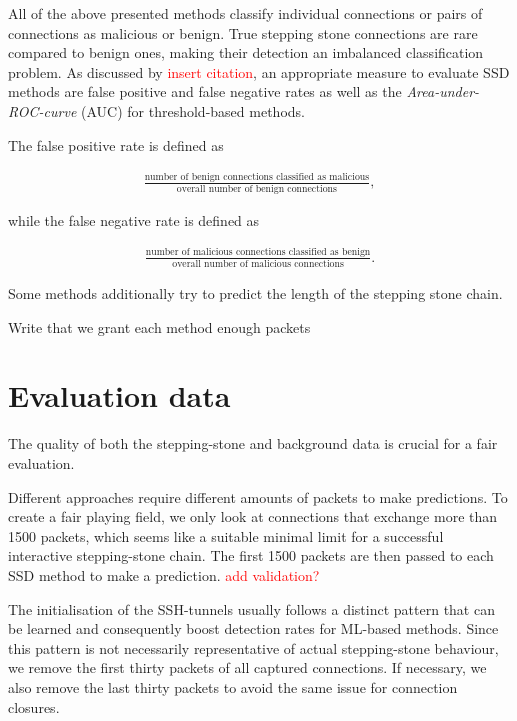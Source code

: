 \documentclass[runningheads]{llncs}\usepackage[]{graphicx}\usepackage[]{color}
\begin{document}
All of the above presented methods classify individual connections or pairs of connections as malicious or benign. True stepping stone connections are rare compared to benign ones, making their detection an imbalanced classification problem. As discussed by \textcolor{red}{insert citation}, an appropriate measure to evaluate SSD methods are false positive and false negative rates as well as the \textit{Area-under-ROC-curve} (AUC) for threshold-based methods.

The false positive rate is defined as

\begin{align*}
\frac{\text{number of benign connections classified as malicious}}{\text{overall number of benign connections}},
\end{align*}

while the false negative rate is defined as

\begin{align*}
\frac{\text{number of malicious connections classified as benign}}{\text{overall number of malicious connections}}.
\end{align*}

Some methods additionally try to predict the length of the stepping stone chain.

Write that we grant each method enough packets

\section{Evaluation data}

The quality of both the stepping-stone and background data is crucial for a fair evaluation.

Different approaches require different amounts of packets to make predictions. To create a fair playing field, we only look at connections that exchange more than 1500 packets, which seems like a suitable minimal limit for a successful interactive stepping-stone chain. The first 1500 packets are then passed to each SSD method to make a prediction.
\textcolor{red}{add validation?}

The initialisation of the SSH-tunnels usually follows a distinct pattern that can be learned and consequently boost detection rates for ML-based methods. Since this pattern is not necessarily representative of actual stepping-stone behaviour, we remove the first thirty packets of all captured connections. If necessary, we also remove the last thirty packets to avoid the same issue for connection closures. 
\end{document}

